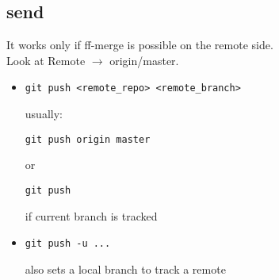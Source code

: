 \documentclass{report}
\begin{document}
\subsection{send}
It works only if ff-merge is possible on the remote side. \\
Look at Remote $\rightarrow$ origin/master.
\begin{itemize}
\item \begin{verbatim}
git push <remote_repo> <remote_branch>
\end{verbatim}
usually:
\begin{verbatim}
git push origin master
\end{verbatim}
or
\begin{verbatim}
git push
\end{verbatim}
if current branch is tracked

\item
\begin{verbatim}
git push -u ...
\end{verbatim}
also sets a local branch to track a remote

\end{itemize}
\end{document}
